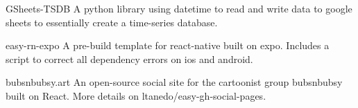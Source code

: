 

\begin{cvskills}

  \cvskill
    {GSheets-TSDB} %
    { A python library using datetime to read and write data to google sheets to essentially create a time-series database.   } %

  \cvskill
    {easy-rn-expo} %
    { A pre-build template for react-native built on expo.  Includes a script to correct all dependency errors on ios and android. } %

  \cvskill
    {bubsnbubsy.art} %
    { An open-source social site for the cartoonist group bubsnbubsy built on React. More details on ltanedo/easy-gh-social-pages.} %



\end{cvskills}